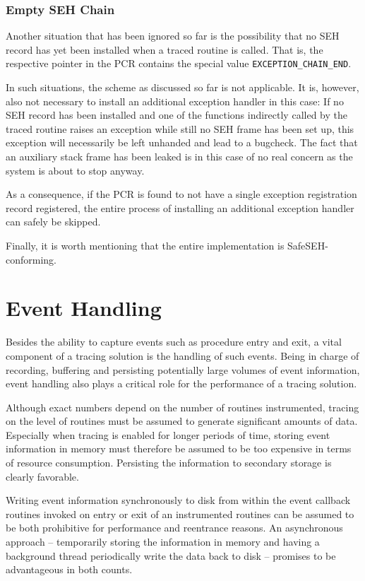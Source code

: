 \subsubsection{Empty SEH Chain}
Another situation that has been ignored so far is the possibility that no
SEH record has yet been installed when a traced routine is called. That is,
the respective pointer in the PCR contains the special value \verb|EXCEPTION_CHAIN_END|.

In such situations, the scheme as discussed so far is not applicable. It is,
however, also not necessary to install an additional exception handler in 
this case: If no SEH record has been installed and one of the functions
indirectly called by the traced routine raises an exception while still no
SEH frame has been set up, this exception will necessarily be left unhanded 
and lead to a bugcheck. The fact that an auxiliary stack frame 
has been leaked is in this case of no real concern as the system is about to
stop anyway. 

As a consequence, if the PCR is found to not have a single exception
registration record registered, the entire process of installing an additional
exception handler can safely be skipped.

Finally, it is worth mentioning that the entire implementation is SafeSEH-conforming.


\section{Event Handling}
\label{sec:EventManagement}
Besides the ability to capture events such as procedure entry and exit, a 
vital component of a tracing solution is the handling of such events. Being in charge
of recording, buffering and persisting potentially large volumes of event 
information, event handling also plays a critical role for the performance 
of a tracing solution. 

Although exact numbers depend on the number of routines instrumented, tracing
on the level of routines must be assumed to generate significant amounts of data. 
Especially when tracing is enabled for longer periods of time, storing event information
in memory must therefore be assumed to be too expensive in terms of resource consumption. 
Persisting the information to secondary storage is clearly favorable.

Writing event information synchronously to disk from within the event callback routines
invoked on entry or exit of an instrumented routines can be assumed to be both 
prohibitive for performance and reentrance reasons. An asynchronous approach -- 
temporarily storing the information in memory and having a background thread periodically 
write the data back to disk -- promises to be advantageous in both counts.


